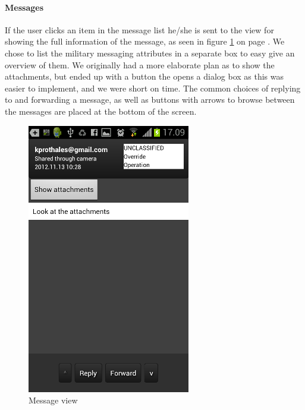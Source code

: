 \paragraph{Messages}\hfill
\newline
If the user clicks an item in the message list he/she is sent to the view for showing the full information of the message, as seen in figure \ref{fig:frontend_message} on page \pageref{fig:frontend_message}. We chose to list the military messaging attributes in a separate box to easy give an overview of them. We originally had a more elaborate plan as to show the attachments, but ended up with a button the opens a dialog box as this was easier to implement, and we were short on time. 
The common choices of replying to and forwarding a message, as well as buttons with arrows to browse between the messages are placed at the bottom of the screen.

\begin{figure}[h!]
\begin{center}
\includegraphics{message_final}
\end{center}
\caption{Message view} \label{fig:frontend_message}
\end{figure}

\newpage

